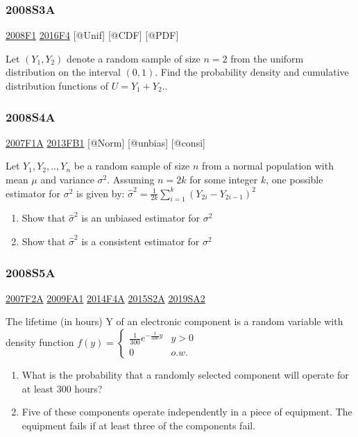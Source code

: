 \documentclass[6pt,twocolumn,Portrait]{article}
\begin{document}
\hypertarget{s3a}{%
\subsubsection{2008S3A}\label{s3a}}

\protect\hyperlink{f1-3}{2008F1} \protect\hyperlink{f4-6}{2016F4}
{[}@Unif{]} {[}@CDF{]} {[}@PDF{]}

Let \((Y_1,Y_2)\) denote a random sample of size \(n=2\) from the
uniform distribution on the interval \((0, 1)\). Find the probability
density and cumulative distribution functions of \(U=Y_1+Y_2\)..

\hypertarget{s4a}{%
\subsubsection{2008S4A}\label{s4a}}

\protect\hyperlink{f1a}{2007F1A} \protect\hyperlink{fb1-2}{2013FB1}
{[}@Norm{]} {[}@unbias{]} {[}@consi{]}

Let \(Y_1,Y_2,..,Y_{n}\) be a random sample of size \(n\) from a normal
population with mean \(\mu\) and variance \(\sigma^2\). Assuming
\(n=2k\) for some integer \(k\), one possible estimator for \(\sigma^2\)
is given by: \(\hat\sigma^2=\frac1{2k}\sum_{i=1}^k(Y_{2i}-Y_{2i-1})^2\)

\begin{enumerate}
\def\labelenumi{(\alph{enumi})}
\item
  Show that \(\hat\sigma^2\) is an unbiased estimator for \(\sigma^2\)
\item
  Show that \(\hat\sigma^2\) is a consistent estimator for \(\sigma^2\)
\end{enumerate}

\hypertarget{s5a}{%
\subsubsection{2008S5A}\label{s5a}}

\protect\hyperlink{f2a}{2007F2A} \protect\hyperlink{fa1}{2009FA1}
\protect\hyperlink{f4a-1}{2014F4A} \protect\hyperlink{s2a-1}{2015S2A}
\protect\hyperlink{sa2-3}{2019SA2}

The lifetime (in hours) Y of an electronic component is a random
variable with density function
\(f(y)=\begin{cases}\frac1{300}e^{-\frac1{300}y}& y>0\\0& o.w.\end{cases}\)

\begin{enumerate}
\def\labelenumi{(\alph{enumi})}
\item
  What is the probability that a randomly selected component will
  operate for at least 300 hours?
\item
  Five of these components operate independently in a piece of
  equipment. The equipment fails if at least three of the components
  fail.
\end{enumerate}
\end{document}
